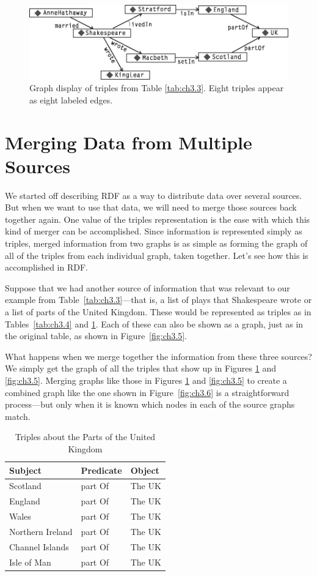 \begin{figure}
    \centering
    \includegraphics[width=5.0in]{media/ch3/f03-04-9780123859655.eps}
    \caption{Graph display of triples from Table \ref{tab:ch3.3}. Eight triples appear as eight labeled edges.}
    \label{fig:ch3.4}
\end{figure}


\section{Merging Data from Multiple Sources}

We started off describing RDF as a way to distribute data over several
sources. But when we want to use that data, we will need to merge those
sources back together again. One value of the triples representation is
the ease with which this kind of merger can be accomplished. Since
information is represented simply as triples, merged information from
two graphs is as simple as forming the graph of all of the triples from
each individual graph, taken together. Let's see how this is
accomplished in RDF.

Suppose that we had another source of information that was relevant to
our example from Table~\ref{tab:ch3.3}---that is, a list of plays that Shakespeare wrote or a list of parts
of the United Kingdom. These would be represented as triples as in
Tables~\ref{tab:ch3.4} and \ref{tab:ch3.5}. Each of these can also be shown as a graph, just as
in the original table, as shown in Figure~\ref{fig:ch3.5}.

What happens when we merge together the information from these three
sources? We simply get the graph of all the triples that show up in
Figures \ref{fig:ch3.4} and \ref{fig:ch3.5}. Merging graphs like those in 
Figures \ref{fig:ch3.4} and \ref{fig:ch3.5} to
create a combined graph like the one shown in Figure~\ref{fig:ch3.6} is a
straightforward process---but only when it is known which nodes in each
of the source graphs match.

\begin{table}[h]
\centering
\begin{tabular}{||l l l||} 
 \hline
 Subject&Predicate&Object \\ [0.5ex] 
 \hline\hline
Scotland&part Of&The UK \\
England&part Of&The UK \\
Wales&part Of&The UK\\
Northern Ireland&part Of&The UK \\
Channel Islands&part Of&The UK\\
Isle of Man&part Of&The UK\\
\hline
\end{tabular}
\caption{Triples about the Parts of the United Kingdom}
\label{tab:ch3.5}
\end{table}

